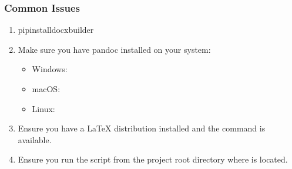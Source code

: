 \documentclass[letterpaper,10pt,english]{sphinxmanual}
\begin{document}
\subsubsection{Common Issues}
\label{\detokenize{documentation_workflow:common-issues}}\begin{enumerate}
%
\item {} 
\sphinxAtStartPar
{}

\begin{sphinxVerbatim}[commandchars=\\\{\}]
pipinstalldocxbuilder
\end{sphinxVerbatim}

\item {} 
\sphinxAtStartPar
{}

\sphinxAtStartPar
Make sure you have pandoc installed on your system:
\begin{itemize}
\item {} 
\sphinxAtStartPar
Windows: 

\item {} 
\sphinxAtStartPar
macOS: 

\item {} 
\sphinxAtStartPar
Linux: 

\end{itemize}

\item {} 
\sphinxAtStartPar
{}

\sphinxAtStartPar
Ensure you have a LaTeX distribution installed and the  command is available.

\item {} 
\sphinxAtStartPar
{}

\sphinxAtStartPar
Ensure you run the script from the project root directory where  is located.

\end{enumerate}
\end{document}

